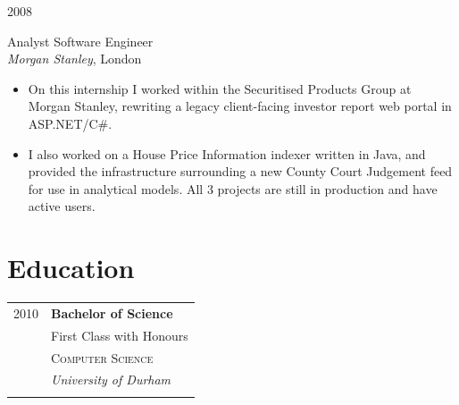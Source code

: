 \documentclass[10pt]{article} %
\begin{document}
{\begin{minipage}[t]{0.5\textwidth}


\end{minipage} %
\hfill
\begin{minipage}[t]{0.44\textwidth} %
\vspace{0pt} %




{\raggedleft\textsc{2008}\par}

{\raggedright\large Analyst Software Engineer\\
\textit{Morgan Stanley}, London\\[5pt]}

\normalsize{
\begin{itemize}
	\item On this internship I worked within the Securitised Products Group at Morgan Stanley, rewriting a legacy client-facing investor report web portal in ASP.NET/C\#.
	\item I also worked on a House Price Information indexer written in Java, and provided the infrastructure surrounding a new County Court Judgement feed for use in analytical models. All 3 projects are still in production and have active users.
\end{itemize}
}


\section{Education} 

\begin{tabular}{rl} %


2010 & \textbf{Bachelor of Science} \\ 
& \small First Class with Honours \\
& \textsc{Computer Science} \\ 
& \textit{University of Durham}\\
&\\
	 

\end{tabular}
\end{minipage}}
\end{document}
